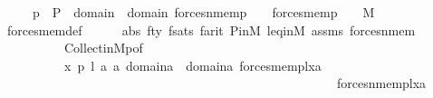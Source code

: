 \begin{isabellebody}
\ \ \ \ \ {\isachardoublequoteopen}{\isacharbraceleft}{\kern0pt}p\ {\isasymin}\ P\ {\isachardot}{\kern0pt}\ {\isasymexists}{\isasymsigma}{\isasymin}domain{\isacharparenleft}{\kern0pt}{\isasymtau}{\isacharparenright}{\kern0pt}\ {\isasymunion}\ domain{\isacharparenleft}{\kern0pt}{\isasymtheta}{\isacharparenright}{\kern0pt}{\isachardot}{\kern0pt}\ forces{\isacharunderscore}{\kern0pt}nmem{\isacharparenleft}{\kern0pt}p{\isacharcomma}{\kern0pt}\ {\isasymsigma}{\isacharcomma}{\kern0pt}\ {\isasymtau}{\isacharparenright}{\kern0pt}\ {\isasymand}\ forces{\isacharunderscore}{\kern0pt}mem{\isacharparenleft}{\kern0pt}p{\isacharcomma}{\kern0pt}\ {\isasymsigma}{\isacharcomma}{\kern0pt}\ {\isasymtheta}{\isacharparenright}{\kern0pt}{\isacharbraceright}{\kern0pt}\ {\isasymin}\ M{\isachardoublequoteclose}\isanewline
\ \ \ \ \isamarkupfalse%
\ forces{\isacharunderscore}{\kern0pt}mem{\isacharunderscore}{\kern0pt}def\isanewline
\ \ \ \ \isamarkupfalse%
\ abs{}\ fty\ fsats{}\ farit\ P{\isacharunderscore}{\kern0pt}in{\isacharunderscore}{\kern0pt}M\ leq{\isacharunderscore}{\kern0pt}in{\isacharunderscore}{\kern0pt}M\ assms\ forces{\isacharunderscore}{\kern0pt}nmem\isanewline
\ \ \ \ \ \ \ \ \ \ Collect{\isacharunderscore}{\kern0pt}in{\isacharunderscore}{\kern0pt}M{\isacharunderscore}{\kern0pt}{}p{\isacharbrackleft}{\kern0pt}of\ {\isacharquery}{\kern0pt}{\isasymphi}\ {\isacharunderscore}{\kern0pt}\ {\isacharunderscore}{\kern0pt}\ {\isacharunderscore}{\kern0pt}\ {\isacharunderscore}{\kern0pt}\ {\isacharunderscore}{\kern0pt}\ \isanewline
\ \ \ \ \ \ \ \ \ \ {\isachardoublequoteopen}{\isasymlambda}x\ p\ l\ a{}\ a{}{\isachardot}{\kern0pt}\ {\isacharparenleft}{\kern0pt}{\isasymexists}{\isasymsigma}{\isasymin}domain{\isacharparenleft}{\kern0pt}a{}{\isacharparenright}{\kern0pt}\ {\isasymunion}\ domain{\isacharparenleft}{\kern0pt}a{}{\isacharparenright}{\kern0pt}{\isachardot}{\kern0pt}\ forces{\isacharunderscore}{\kern0pt}mem{\isacharprime}{\kern0pt}{\isacharparenleft}{\kern0pt}p{\isacharcomma}{\kern0pt}l{\isacharcomma}{\kern0pt}x{\isacharcomma}{\kern0pt}{\isasymsigma}{\isacharcomma}{\kern0pt}a{}{\isacharparenright}{\kern0pt}\ {\isasymand}\ \isanewline
\ \ \ \ \ \ \ \ \ \ \ \ \ \ \ \ \ \ \ \ \ \ \ \ \ \ \ \ \ \ \ \ \ \ \ \ \ \ \ \ \ \ \ \ \ \ \ \ \ \ \ \ \ forces{\isacharunderscore}{\kern0pt}nmem{\isacharprime}{\kern0pt}{\isacharparenleft}{\kern0pt}p{\isacharcomma}{\kern0pt}l{\isacharcomma}{\kern0pt}x{\isacharcomma}{\kern0pt}{\isasymsigma}{\isacharcomma}{\kern0pt}a{}{\isacharparenright}{\kern0pt}{\isacharparenright}{\kern0pt}{\isachardoublequoteclose}{\isacharbrackright}{\kern0pt}\isanewline

\end{isabellebody}
